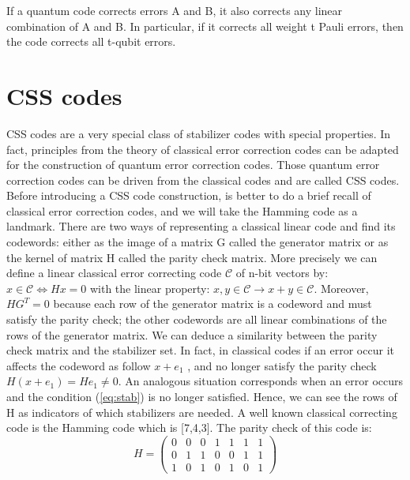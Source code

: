 \begin{theorem}
If a quantum code corrects errors A and B, it also corrects any linear combination of A and B. In particular, if it corrects all weight t Pauli errors, then the code corrects all t-qubit errors.
\end{theorem}


\section{CSS codes}
CSS codes are a very special class of stabilizer codes with special properties. In fact, principles from the theory of classical error correction codes can be adapted for the construction of quantum error correction codes. Those quantum error correction codes can be driven from the classical codes and are called CSS codes.
Before introducing a CSS code construction, is better to do a brief recall of classical error correction codes, and we will take the Hamming code as a landmark.
There are two ways of representing a classical linear code and find its codewords: either as the image of a matrix G called the generator matrix or as the kernel of matrix H called the parity check matrix. More precisely we can define a linear classical error correcting code $\mathcal{C}$ of n-bit vectors by: $x \in \mathcal{C} \iff  Hx = 0$ with the linear property: $x,y \in \mathcal{C} \rightarrow x+y \in \mathcal{C}$. Moreover, $HG^T=0$ because each row of the generator matrix is a codeword and must satisfy the parity check; the other codewords are all linear combinations of the rows of the generator matrix.
We can deduce a similarity between the parity check matrix and the stabilizer set. 
In fact, in classical codes if an error occur it affects the codeword as follow $x+e_1$ , and no longer satisfy the parity check $H(x+e_1) = He_1 \neq 0$. An analogous situation corresponds when an error occurs and the condition (\ref{eq:stab}) is no longer satisfied.  
Hence, we can see the rows of H as indicators of which stabilizers are needed.
A well known classical correcting code is the Hamming code which is [7,4,3]. The parity check of this code is: 
\begin{equation*}
    H=\left(\begin{array}{ccccccc}
         0&0&0&1&1&1&1 \\
         0&1&1&0&0&1&1 \\
         1&0&1&0&1&0&1 
    \end{array}\right) 
\end{equation*}
